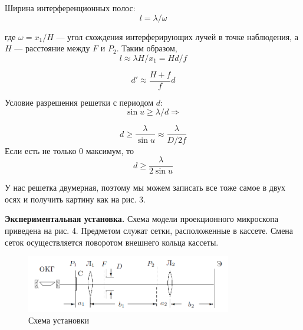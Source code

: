 \documentclass[a4paper,12pt]{article}
\begin{document}
	Ширина интерференционных полос:
	\begin{equation}
	l = \lambda/\omega
	\end{equation} 
	
	где $\omega = x_1/H$ --- угол схождения интерферирующих лучей в точке наблюдения, а $H$ --- расстояние между $F$ и $P_2$. Таким образом, 
	\begin{equation}
	l \approx \lambda H/x_1 = H d/f
	\end{equation}
	
	\begin{equation}
	d' \approx \dfrac{H + f}{f} d
	\end{equation}
	
	Условие разрешения решетки с периодом $d$:
	\begin{equation}
	\sin u \geqslant \lambda/d \Rightarrow 
	\end{equation}
	
	\begin{equation}
	d \geqslant \dfrac{\lambda}{\sin u} \approx \dfrac{\lambda}{D/2f}
	\end{equation}
	Если есть не только 0 максимум, то 
	\begin{equation}
	d \geqslant \dfrac{\lambda}{2 \sin u}
	\end{equation}
	
	У нас решетка двумерная, поэтому мы можем записать все тоже самое в двух осях и получить картину как на рис. 3.
	
	
	\textbf{Экспериментальная установка.} Схема модели проекционного микроскопа приведена на рис. 4. Предметом служат сетки, расположенные в кассете. Смена сеток осуществляется поворотом внешнего кольца кассеты.
	
	\begin{figure}[h]
		\begin{center}
			\includegraphics[width = 0.8\textwidth]{433-4.png}
			\caption{Схема установки}
		\end{center}
	\end{figure}
	
\end{document}
